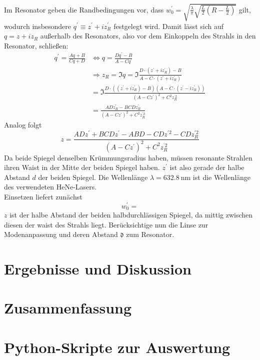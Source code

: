 \documentclass[11pt,a4paper,oneside]{scrartcl}
\begin{document}
Im Resonator geben die Randbedingungen vor, dass $w_0^\prime=\sqrt{\frac{\lambda}{\pi}\sqrt{\frac{L}{2}\left(R-\frac{L}{2}\right)}}$ gilt, wodurch insbesondere $q^\prime\equiv z^\prime+iz_R^\prime$ festgelegt wird. Damit lässt sich auf $q=z+iz_R$ außerhalb des Resonators, also vor dem Einkoppeln des Strahls in den Resonator, schließen:
\begin{align}
q^\prime=\frac{Aq+B}{Cq+D}& \iff q = \frac{Dq^\prime-B}{A-Cq^\prime}\\ & \Rightarrow z_R=\Im{q}=\Im{\frac{D\cdot (z^\prime+iz_R^\prime)-B}{A-C\cdot(z^\prime+iz_R^\prime)}}\\ \quad&=\Im{\frac{D\cdot ((z^\prime+iz_R^\prime)-B)(A-C\cdot(z^\prime-iz_R^\prime))}{(A-Cz^\prime)^2+C^2z_R^{^\prime 2}}}\\ \quad&
=\frac{ADz_R^\prime-BCDz_R^\prime}{(A-Cz^\prime)^2+C^2z_R^{^\prime 2}}
\end{align}
Analog folgt 
\begin{equation}
z=\frac{ADz^\prime+BCDz^\prime-ABD-CDz^{\prime 2}-CDz_R^{\prime 2}}{(A-Cz^\prime)^2+C^2z_R^{^\prime 2}}
\end{equation}
Da beide Spiegel denselben Krümmungsradius haben, müssen resonante Strahlen ihren Waist in der Mitte der beiden Spiegel haben. $z^\prime$ ist also gerade der halbe Abstand $d$ der beiden Spiegel. Die Wellenlänge $\lambda=632.8\ \mathrm{nm}$ ist die Wellenlänge des verwendeten HeNe-Lasers. \\
Einsetzen liefert zunächst
\begin{equation}
w_0^\prime = 
\end{equation}
 $z$ ist der halbe Abstand der beiden halbdurchlässigen Spiegel, da mittig zwischen diesen der waist des Strahls liegt. Berücksichtige nun die Linse zur Modenanpassung und deren Abstand $\mathfrak{d}$ zum Resonator.
\section{Ergebnisse und Diskussion}
\section{Zusammenfassung}
\newpage

 

\appendix

\section{Python-Skripte zur Auswertung}
\end{document}
